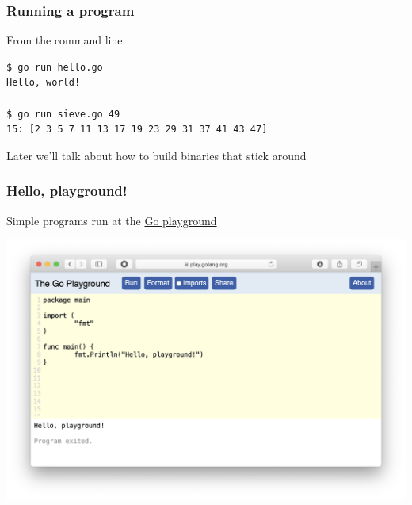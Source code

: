 \documentclass[handout,compress,t,11pt]{beamer}
\begin{document}
\begin{frame}[fragile]
    \frametitle{Running a program}
    From the command line: \par
    \vspace{\baselineskip}
\begin{verbatim}
$ go run hello.go
Hello, world!

$ go run sieve.go 49
15: [2 3 5 7 11 13 17 19 23 29 31 37 41 43 47] 
\end{verbatim}\par
    \vspace{3\baselineskip}
    Later we'll talk about how to build binaries that stick around
\end{frame}

\begin{frame}[fragile]
\frametitle{Hello, playground!}
Simple programs run at the \href{https://play.golang.org}{Go playground}
    \vspace{-0.4\baselineskip}
\begin{center}
\includegraphics[height=.9\textheight]{go-playground.png}
\end{center}
\end{frame}
\end{document}
